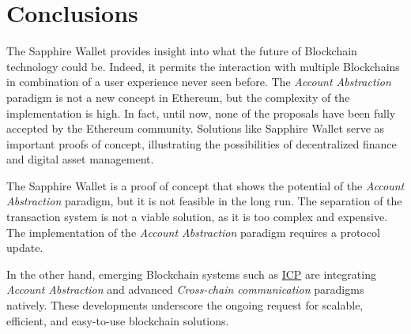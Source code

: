 \chapter{Conclusions}
\label{sec:conclusions}

The Sapphire Wallet provides insight into what the future of Blockchain technology could be. Indeed, it permits the interaction with multiple Blockchains in combination of a user experience never seen before. The \textit{Account Abstraction} paradigm is not a new concept in Ethereum, but the complexity of the implementation is high. In fact, until now, none of the proposals have been fully accepted by the Ethereum community. Solutions like Sapphire Wallet serve as important proofs of concept, illustrating the possibilities of decentralized finance and digital asset management.

The Sapphire Wallet is a proof of concept that shows the potential of the \textit{Account Abstraction} paradigm, but it is not feasible in the long run. The separation of the transaction system is not a viable solution, as it is too complex and expensive. The implementation of the \textit{Account Abstraction} paradigm requires a protocol update.


In the other hand, emerging Blockchain systems such as \hyperref[sec:icp]{ICP} are integrating \textit{Account Abstraction} and advanced \textit{Cross-chain communication} paradigms natively. These developments underscore the ongoing request for scalable, efficient, and easy-to-use blockchain solutions. 